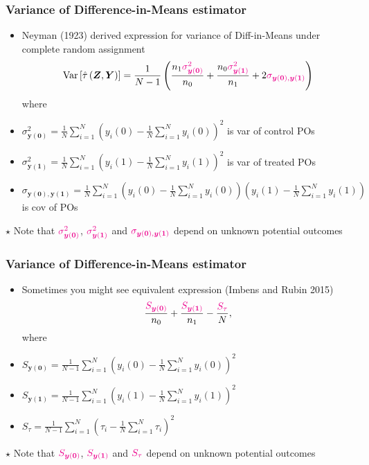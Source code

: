 \documentclass[table, xcolor = {dvipsnames}, 9pt]{beamer}
\theoremstyle{plain}
\newcommand{\mh}[1]{{\color{magenta}{#1}}}
\DeclareMathOperator{\Var}{\rm{Var}}
\begin{document}
\begin{frame}
\frametitle{Variance of Difference-in-Means estimator}
\begin{itemize}
\item Neyman (1923) derived expression for variance of Diff-in-Means under complete random assignment
\begin{equation*}
\Var\left[\hat{\tau}\left(\bm{Z}, \bm{Y}\right)\right] = \frac{1}{N - 1}\left(\frac{n_1 \mh{\sigma^2_{\bm{y}(\bm{0})}}}{n_0} + \frac{n_0 \mh{\sigma^2_{\bm{y}(\bm{1})}}}{n_1} + 2\mh{\sigma_{\bm{y}(\bm{0}), \bm{y}(\bm{1})}}\right)
\end{equation*}
where
\item[] $\sigma^2_{\bm{y}(\bm{0})} = \frac{1}{N} \sum \limits_{i = 1}^N \left(y_i(0) - \frac{1}{N} \sum \limits_{i = 1}^N y_i(0)\right)^2$ is var of control POs
\item[] $\sigma^2_{\bm{y}(\bm{1})} = \frac{1}{N} \sum \limits_{i = 1}^N \left(y_i(1) - \frac{1}{N} \sum \limits_{i = 1}^N y_i(1)\right)^2$ is var of treated POs
\item[] $\sigma_{\bm{y}(\bm{0}), \bm{y}(\bm{1})} = \frac{1}{N} \sum \limits_{i = 1}^N \left(y_i(0) - \frac{1}{N} \sum \limits_{i = 1}^N y_i(0)\right)\left(y_i(1) - \frac{1}{N} \sum \limits_{i = 1}^N y_i(1)\right)$ is cov of POs
\end{itemize} \pause
\vspace{1em}
$\star$ Note that $\mh{\sigma^2_{\bm{y}(\bm{0})}}$, $\mh{\sigma^2_{\bm{y}(\bm{1})}}$ and $\mh{\sigma_{\bm{y}(\bm{0}), \bm{y}(\bm{1})}}$ depend on unknown potential outcomes
\end{frame}
\begin{frame}
\frametitle{Variance of Difference-in-Means estimator}
\begin{itemize}
\item Sometimes you might see equivalent expression (Imbens and Rubin 2015)
\begin{equation*}
\dfrac{\mh{S_{\bm{y}(\bm{0})}}}{n_0} + \dfrac{\mh{S_{\bm{y}(\bm{1})}}}{n_1} - \dfrac{\mh{S_{\tau}}}{N},
\end{equation*}
where
\item[] $S_{\bm{y}(\bm{0})} = \frac{1}{N - 1} \sum \limits_{i = 1}^N \left(y_i(0) - \frac{1}{N} \sum \limits_{i = 1}^N y_i(0)\right)^2$
\item[] $S_{\bm{y}(\bm{1})} = \frac{1}{N - 1} \sum \limits_{i = 1}^N \left(y_i(1) - \frac{1}{N} \sum \limits_{i = 1}^N y_i(1)\right)^2$
\item[] $S_{\tau} = \frac{1}{N - 1} \sum \limits_{i = 1}^N \left(\tau_i - \frac{1}{N} \sum \limits_{i = 1}^N \tau_i\right)^2$
\end{itemize} \pause
\vspace{1em}
$\star$ Note that $\mh{S_{\bm{y}(\bm{0})}}$, $\mh{S_{\bm{y}(\bm{1})}}$ and $\mh{S_{\tau}}$ depend on unknown potential outcomes
\end{frame}
\end{document}

